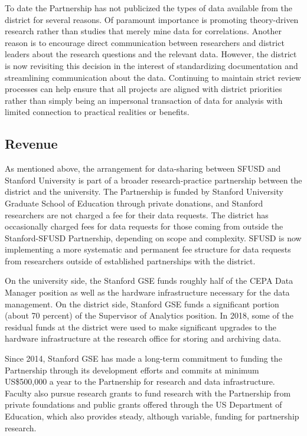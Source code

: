 To date the Partnership has not publicized the types of data available from the district for several reasons. Of paramount importance is promoting theory-driven research rather than studies that merely mine data for correlations. Another reason is to encourage direct communication between researchers and district leaders about the research questions and the relevant data. However, the district is now revisiting this decision in the interest of standardizing documentation and streamlining communication about the data. Continuing to maintain strict review processes can help ensure that all projects are aligned with district priorities rather than simply being an impersonal transaction of data for analysis with limited connection to practical realities or benefits.

\hypertarget{revenue-3}{%
\subsection{Revenue}\label{revenue-3}}

As mentioned above, the arrangement for data-sharing between SFUSD and Stanford University is part of a broader research-practice partnership between the district and the university. The Partnership is funded by Stanford University Graduate School of Education through private donations, and Stanford researchers are not charged a fee for their data requests. The district has occasionally charged fees for data requests for those coming from outside the Stanford-SFUSD Partnership, depending on scope and complexity. SFUSD is now implementing a more systematic and permanent fee structure for data requests from researchers outside of established partnerships with the district.

On the university side, the Stanford GSE funds roughly half of the CEPA Data Manager position as well as the hardware infrastructure necessary for the data management. On the district side, Stanford GSE funds a significant portion (about 70 percent) of the Supervisor of Analytics position. In 2018, some of the residual funds at the district were used to make significant upgrades to the hardware infrastructure at the research office for storing and archiving data.

Since 2014, Stanford GSE has made a long-term commitment to funding the Partnership through its development efforts and commits at minimum US\$500,000 a year to the Partnership for research and data infrastructure. Faculty also pursue research grants to fund research with the Partnership from private foundations and public grants offered through the US Department of Education, which also provides steady, although variable, funding for partnership research.

